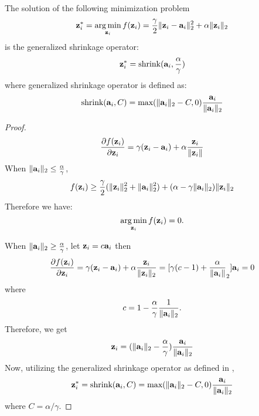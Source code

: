 \begin{thm}\label{thm:updatez}
The solution of the following minimization problem
$$
\mathbf{z}_i^* = \mathop{\rm arg\,min}_{\mathbf{z}_i} f({\bf z}_i) = \frac{\gamma}{2}\|{\bf z}_i-{\bf a}_i\|_2^2 + \alpha \|{\bf z}_i\|_2
$$
is the generalized shrinkage operator:
$$
{\bf z}_i^* = \mbox{shrink}({\bf a}_i , \frac{\alpha}{\gamma})
$$
where generalized shrinkage operator is defined as:
$$
\mbox{shrink}({\bf a}_i,C) = \mbox{max}(\|{\bf a}_i\|_2 -C,0)\frac{{\bf a}_i}{\|{\bf a}_i\|_2}
$$
\end{thm}
\vspace{-0.8in}
\begin{proof}
$$
\frac{\partial f({\bf z}_i)}{\partial {\bf z}_i} = \gamma ({\bf z}_i - {\bf a}_i) + \alpha \frac{{\bf z}_i}{\|{\bf z}_i\|}
$$
When $\|{\bf a}_i\|_2 \le \frac{\alpha}{\gamma}$,
$$
f({\bf z}_i) \ge \frac{\gamma}{2}(\|{\bf z}_i\|^2_2 + \|{\bf a}_i\|^2_2)  + (\alpha-\gamma\|{\bf a}_i\|_2)\|{\bf z}_i\|_2
$$
Therefore we have:
$$
\mathop{\rm arg\,min}_{{\bf z}_i} f({\bf z}_i) =0.
$$

When $\|{\bf a}_i\|_2 \ge \frac{\alpha}{\gamma}$,
let ${\bf z}_i = c{\bf a}_i$ then
$$
\frac{\partial f({\bf z}_i)}{\partial {\bf z}_i} = \gamma ({\bf z}_i - {\bf a}_i) + \alpha \frac{{\bf z}_i}{\|{\bf z}_i\|_2} = [ \gamma( c - 1 ) + \frac{\alpha}{\|{\bf a}_i\|}_2 ]{\bf a}_i=0
$$
where
$$
c =  1 - \frac{\alpha}{\gamma}\frac{1}{\|{\bf a}_i\|_2}.
$$
Therefore, we get
$$
{\bf z}_i =  (\|{\bf a}_i\|_2 - \frac{\alpha}{\gamma})\frac{{\bf a}_i}{\|{\bf a}_i\|_2}
$$
Now, utilizing the generalized shrinkage operator as defined in \cite{esser2010}\cite{wang2008},
$$
{\bf z}_i^* = \mbox{shrink}({\bf a}_i,C) = \mbox{max}(\|{\bf a}_i\|_2 -C,0)\frac{{\bf a}_i}{\|{\bf a}_i\|_2}
$$
where $C=\alpha/\gamma$.
\end{proof}

